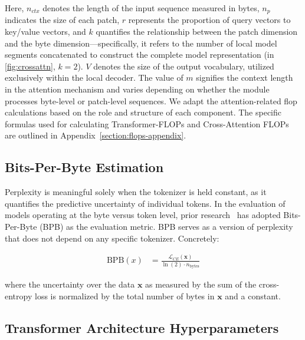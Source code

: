 Here, $n_{ctx}$ denotes the length of the input sequence measured in bytes, $n_p$ indicates the size of each patch, $r$ represents the proportion of query vectors to key/value vectors, and $k$ quantifies the relationship between the patch dimension and the byte dimension—specifically, it refers to the number of local model segments concatenated to construct the complete model representation (in \autoref{fig:crossattn}, $k=2$). $V$ denotes the size of the output vocabulary, utilized exclusively within the local decoder. The value of $m$ signifies the context length in the attention mechanism and varies depending on whether the module processes byte-level or patch-level sequences. We adapt the attention-related flop calculations based on the role and structure of each component. The specific formulas used for calculating Transformer-FLOPs and Cross-Attention FLOPs are outlined in Appendix~\ref{section:flops-appendix}.

\subsection{Bits-Per-Byte Estimation} Perplexity is meaningful solely when the tokenizer is held constant, as it quantifies the predictive uncertainty of individual tokens. In the evaluation of models operating at the byte versus token level, prior research~\citep{xue2022byt5, yu2023megabyte, wang2024mambabyte} has adopted Bits-Per-Byte (BPB) as the evaluation metric. BPB serves as a version of perplexity that does not depend on any specific tokenizer. Concretely:

\begin{align}
    \text{BPB}(x)&= \frac{\mathcal{L}_{CE}(\pmb{x})}{\ln(2)\cdot n_{\text{bytes}}}
\end{align}

where the uncertainty over the data $\pmb{x}$ as measured by the sum of the cross-entropy loss is normalized by the total number of bytes in $\pmb{x}$ and a constant. 

\subsection{Transformer Architecture Hyperparameters} 

